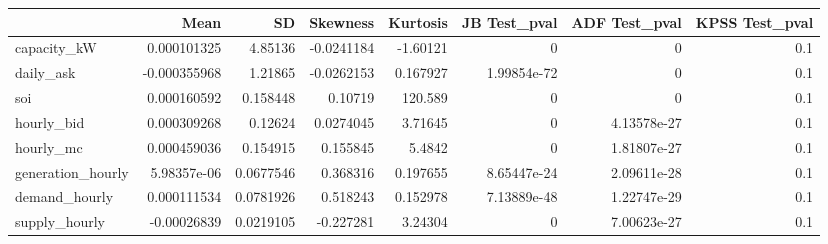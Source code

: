 \begin{tabular}{lrrrrrrr}
\hline
                   &         Mean &        SD &   Skewness &   Kurtosis &   JB Test\_pval &   ADF Test\_pval &   KPSS Test\_pval \\
\hline
 capacity\_kW       &  0.000101325 & 4.85136   & -0.0241184 &  -1.60121  &    0           &     0           &              0.1 \\
 daily\_ask         & -0.000355968 & 1.21865   & -0.0262153 &   0.167927 &    1.99854e-72 &     0           &              0.1 \\
 soi               &  0.000160592 & 0.158448  &  0.10719   & 120.589    &    0           &     0           &              0.1 \\
 hourly\_bid        &  0.000309268 & 0.12624   &  0.0274045 &   3.71645  &    0           &     4.13578e-27 &              0.1 \\
 hourly\_mc         &  0.000459036 & 0.154915  &  0.155845  &   5.4842   &    0           &     1.81807e-27 &              0.1 \\
 generation\_hourly &  5.98357e-06 & 0.0677546 &  0.368316  &   0.197655 &    8.65447e-24 &     2.09611e-28 &              0.1 \\
 demand\_hourly     &  0.000111534 & 0.0781926 &  0.518243  &   0.152978 &    7.13889e-48 &     1.22747e-29 &              0.1 \\
 supply\_hourly     & -0.00026839  & 0.0219105 & -0.227281  &   3.24304  &    0           &     7.00623e-27 &              0.1 \\
\hline
\end{tabular}